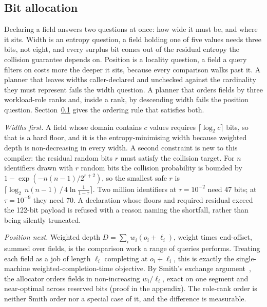 \documentclass{svproc}
\begin{document}
\subsection{Bit allocation}
\label{sec:bit-allocation}

Declaring a field answers two questions at once: how wide it must be, and where
it sits. Width is an entropy question, a field holding one of five values
needs three bits, not eight, and every surplus bit comes out of the residual
entropy the collision guarantee depends on. Position is a locality question,
a field a query filters on costs more the deeper it sits, because every
comparison walks past it. A planner that leaves widths caller-declared and
unchecked against the cardinality they must represent fails the width question.
A planner that orders fields by three workload-role ranks and, inside a rank,
by descending width fails the position question. Section~\ref{sec:bit-allocation}
gives the ordering rule that satisfies both.

\noindent\emph{Widths first.} A field whose domain contains $c$ values requires
$\lceil \log_2 c \rceil$ bits, so that is a hard floor, and it is the
entropy-minimising width because weighted depth is non-decreasing in every
width. A second constraint is new to this compiler: the residual random bits
$r$ must satisfy the collision target. For $n$ identifiers drawn with $r$
random bits the collision probability is bounded by
$1 - \exp(-n(n-1)/2^{r+2})$, so the smallest safe $r$ is
$\lceil \log_2\, n(n-1)\,/\,4\ln\frac{1}{1-\tau} \rceil$. Two million
identifiers at $\tau = 10^{-2}$ need 47 bits; at $\tau = 10^{-9}$ they need 70.
A declaration whose floors and required residual exceed the 122-bit payload is
refused with a reason naming the shortfall, rather than being silently
truncated.

\noindent\emph{Position next.} Weighted depth $D = \sum_i w_i (o_i + \ell_i)$,
weight times end-offset, summed over fields, is the comparison work a
range of queries performs. Treating each field as a job of length $\ell_i$
completing at $o_i+\ell_i$, this is exactly the single-machine
weighted-completion-time objective. By Smith's exchange argument~\cite{24}, the allocator orders fields in non-increasing $w_i/\ell_i$, exact on one segment and near-optimal across reserved bits (proof in the appendix). The role-rank order is neither Smith order nor a special
case of it, and the difference is measurable.
\end{document}
